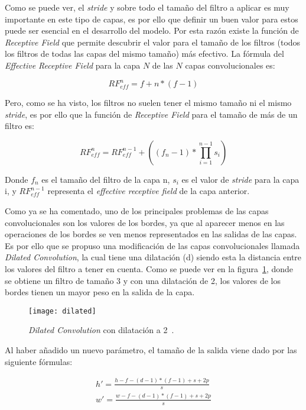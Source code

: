Como se puede ver, el \textit{stride} y sobre todo el tamaño del filtro a aplicar es muy importante en este tipo de capas, es por ello que definir un buen valor para estos puede ser esencial en el desarrollo del modelo. Por esta razón existe la función de \textit{Receptive Field} que permite descubrir el valor para el tamaño de los filtros (todos los filtros de todas las capas del mismo tamaño) más efectivo. La fórmula del \textit{Effective Receptive Field} para la capa $N$ de las $N$ capas convolucionales es:

\begin{equation}
RF_{eff}^n = f + n*(f-1)
\end{equation}

Pero, como se ha visto, los filtros no suelen tener el mismo tamaño ni el mismo \textit{stride}, es por ello que la función de \textit{Receptive Field} para el tamaño de más de un filtro es:

\begin{equation}
RF_{eff}^n = RF_{eff}^{n-1} + ((f_n -1)* \prod_{i=1}^{n-1}s_i)
\end{equation}

Donde $f_n$ es el tamaño del filtro de la capa n, $s_i$ es el valor de \textit{stride} para la capa i, y $RF_{eff}^{n-1}$ representa el \textit{effective receptive field} de la capa anterior.

Como ya se ha comentado, uno de los principales problemas de las capas convolucionales son los valores de los bordes, ya que al aparecer menos en las operaciones de los bordes se ven menos representados en las salidas de las capas. Es por ello que se propuso una modificación de las capas convolucionales llamada \textit{Dilated Convolution}, la cual tiene una dilatación (d) siendo esta la distancia entre los valores del filtro a tener en cuenta. Como se puede ver en la figura~\ref{fig:dilated}, donde se obtiene un filtro de tamaño 3 y con una dilatación de 2, los valores de los bordes tienen un mayor peso en la salida de la capa.

\begin{figure}[h]
	\centering
	\texttt{[image: dilated]}
	\caption{\textit{Dilated Convolution} con dilatación a 2~\cite{cnn}.}
	\label{fig:dilated}
\end{figure}

Al haber añadido un nuevo parámetro, el tamaño de la salida viene dado por las siguiente fórmulas:

\begin{equation}
\begin{split}
h'=\frac{h-f-(d-1)*(f-1)+s+2p}{s}\\w'=\frac{w-f-(d-1)*(f-1)+s+2p}{s}
\end{split}
\end{equation}

